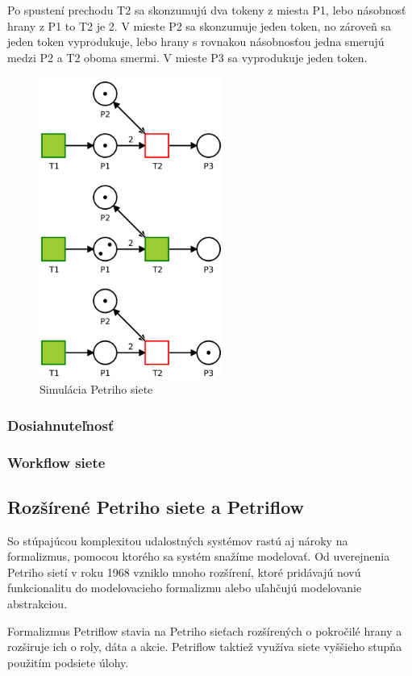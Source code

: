 Po spustení prechodu T2 sa skonzumujú dva tokeny z miesta P1, lebo násobnosť hrany  z P1 to T2 je 2. V mieste P2 sa skonzumuje jeden token, no zároveň sa jeden token vyprodukuje, lebo hrany s rovnakou násobnosťou jedna smerujú medzi P2 a T2 oboma smermi. V mieste P3 sa vyprodukuje jeden token.
\begin{figure}[!htbp]
\centering
\includegraphics[width=6cm]{img/pn_example_run.png}
\caption{Simulácia Petriho siete}
\label{pn_example_run}
\end{figure}

\subsubsection{Dosiahnuteľnosť}

\subsubsection{Workflow siete}

\subsection{Rozšírené Petriho siete a Petriflow}

So stúpajúcou komplexitou udalostných systémov rastú aj nároky na formalizmus, pomocou ktorého sa systém snažíme modelovať. 
Od uverejnenia Petriho sietí v roku 1968 vzniklo mnoho rozšírení, ktoré pridávajú novú funkcionalitu do modelovacieho formalizmu alebo uľahčujú modelovanie abstrakciou. 

Formalizmus Petriflow stavia na Petriho sieťach rozšírených o pokročilé hrany a rozširuje ich o roly, dáta a akcie. Petriflow taktiež využíva siete vyššieho stupňa použitím podsiete úlohy.


